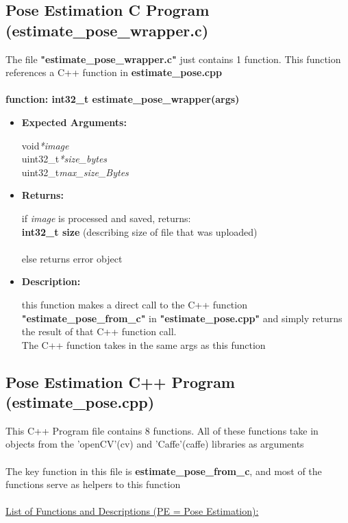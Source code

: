 \documentclass{scrreprt}
\begin{document}
\subsection{Pose Estimation C Program (estimate\_pose\_wrapper.c)}
The file \textbf{"estimate\_pose\_wrapper.c"} just contains 1 function. This function references a C++ function in \textbf{estimate\_pose.cpp}
\\\\
\textbf{function: int32\_t estimate\_pose\_wrapper(args)}
\begin{itemize}
    \item \textbf{Expected Arguments:}

    void\quad\textit{*image}
    \\
    uint32\_t\quad\textit{*size\_bytes}
    \\
    uint32\_t\quad\textit{max\_size\_Bytes}

    \item\quad\textbf{Returns:}

    if \textit{image} is processed and saved, returns:\\\textbf{int32\_t size}
    (describing size of file that was uploaded)
    \\\\
    else returns error object

    \item \textbf{Description:}

    this function makes a direct call to the C++ function \textbf{"estimate\_pose\_from\_c"} in \textbf{"estimate\_pose.cpp"} and simply returns the result of that C++ function call.
    \\
    The C++ function takes in the same args as this function
\end{itemize}

\subsection{Pose Estimation C++ Program (estimate\_pose.cpp)}

This C++ Program file contains 8 functions. All of these functions take in objects from the 'openCV'(cv) and 'Caffe'(caffe) libraries as arguments
\\\\
The key function in this file is \textbf{estimate\_pose\_from\_c}, and most of the functions serve as helpers to this function
\\\\
\underline{List of Functions and Descriptions (PE = Pose Estimation):}
\\
\end{document}
